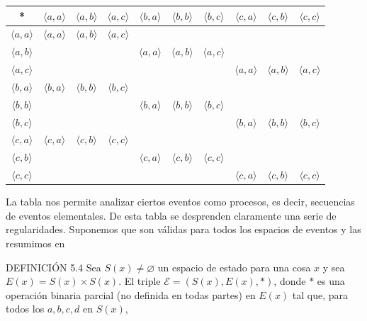 \begin{justifying}
	\begin{center}
			\setlength{\tabcolsep}{3pt}
			\footnotesize \begin{tabular}{c|ccccccccc}
				* & $\langle a,a \rangle$ & $\langle a,b \rangle$ & $\langle a,c \rangle$ & $\langle b,a \rangle$ & $\langle b,b \rangle$ & $\langle b,c \rangle$ & $\langle c,a \rangle$ & $\langle c,b \rangle$ & $\langle c,c \rangle$ \\
				\hline
				$\langle a,a \rangle$ & $\langle a,a \rangle$ & $\langle a,b \rangle$ & $\langle a,c \rangle$ & & & & & & \\
				$\langle a,b \rangle$ &  &  &  & $\langle a,a \rangle$ & $\langle a,b \rangle$ & $\langle a,c \rangle$ & & & \\
				$\langle a,c \rangle$ &  &  &  &  &  &  & $\langle a,a \rangle$ & $\langle a,b \rangle$ & $\langle a,c \rangle$ \\
				$\langle b,a \rangle$ & $\langle b,a \rangle$ & $\langle b,b \rangle$ & $\langle b,c \rangle$ & & & & & & \\
				$\langle b,b \rangle$ &  & & & $\langle b,a \rangle$ & $\langle b,b \rangle$ & $\langle b,c \rangle$ & & & \\
				$\langle b,c \rangle$ &  & & & & & & $\langle b,a \rangle$ & $\langle b,b \rangle$ & $\langle b,c \rangle$ \\
				$\langle c,a \rangle$ & $\langle c,a \rangle$ & $\langle c,b \rangle$ & $\langle c,c \rangle$ & & & & & & \\
				$\langle c,b \rangle$ &  & & & $\langle c,a \rangle$ & $\langle c,b \rangle$ & $\langle c,c \rangle$ & & & \\
				$\langle c,c \rangle$ &  &  & & & & & $\langle c,a \rangle$ & $\langle c,b \rangle$ & $\langle c,c \rangle$ \\
			\end{tabular}
	\end{center}

	\noindent La tabla nos permite analizar ciertos eventos como procesos, es decir, secuencias de eventos elementales.
	De esta tabla se desprenden claramente una serie de regularidades. Suponemos
	que son válidas para todos los espacios de eventos y las resumimos en

	\bigskip

	\noindent DEFINICIÓN 5.4 Sea $S(x) \neq \varnothing$ un espacio de estado para una cosa $x$ y sea
	$E(x)=S(x) \times S(x)$. El triple $\mathscr{E} =(S(x),E(x), *)$, donde $*$ es una operación binaria parcial
	(no definida en todas partes) en $E(x)$ tal que, para todos los
	$a, b, c, d$ en $S(x)$,


\end{justifying}

